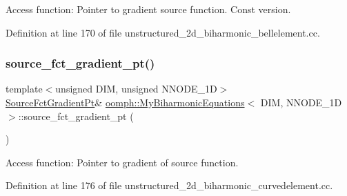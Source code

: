 Access function\+: Pointer to gradient source function. Const version. 



Definition at line 170 of file unstructured\+\_\+2d\+\_\+biharmonic\+\_\+bellelement.\+cc.

\mbox{\label{classoomph_1_1MyBiharmonicEquations_a9da77a58e4d4a96e6cfe1eb708bca631}} 
\subsubsection{\texorpdfstring{source\+\_\+fct\+\_\+gradient\+\_\+pt()}{source\_fct\_gradient\_pt()}\hspace{0.1cm}{\footnotesize\ttfamily [3/4]}}
{\footnotesize\ttfamily template$<$unsigned D\+IM, unsigned N\+N\+O\+D\+E\+\_\+1D$>$ \\
\hyperlink{classoomph_1_1MyBiharmonicEquations_af007c03701e888fed7375cb4537f0046}{Source\+Fct\+Gradient\+Pt}\& \hyperlink{classoomph_1_1MyBiharmonicEquations}{oomph\+::\+My\+Biharmonic\+Equations}$<$ D\+IM, N\+N\+O\+D\+E\+\_\+1D $>$\+::source\+\_\+fct\+\_\+gradient\+\_\+pt (\begin{DoxyParamCaption}{ }\end{DoxyParamCaption})\hspace{0.3cm}{\ttfamily [inline]}}



Access function\+: Pointer to gradient of source function. 



Definition at line 176 of file unstructured\+\_\+2d\+\_\+biharmonic\+\_\+curvedelement.\+cc.

\mbox{\label{classoomph_1_1MyBiharmonicEquations_a3c6a713fdc0847a374c58ef4760046ec}} 

